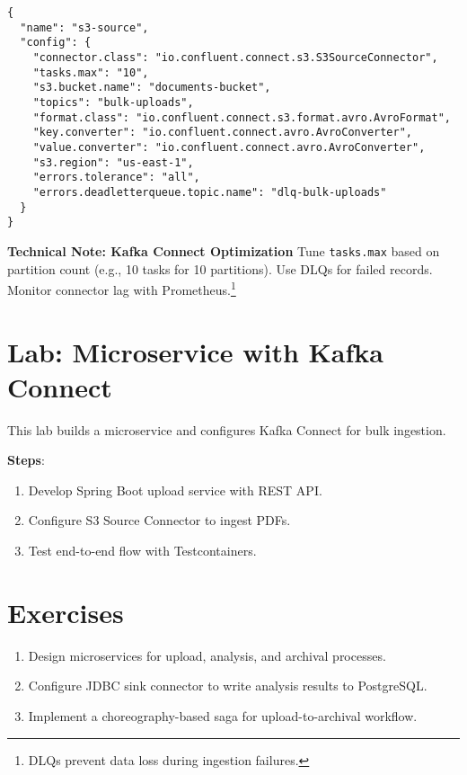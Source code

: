 \documentclass[11pt]{article}
\begin{document}
\begin{verbatim}
{
  "name": "s3-source",
  "config": {
    "connector.class": "io.confluent.connect.s3.S3SourceConnector",
    "tasks.max": "10",
    "s3.bucket.name": "documents-bucket",
    "topics": "bulk-uploads",
    "format.class": "io.confluent.connect.s3.format.avro.AvroFormat",
    "key.converter": "io.confluent.connect.avro.AvroConverter",
    "value.converter": "io.confluent.connect.avro.AvroConverter",
    "s3.region": "us-east-1",
    "errors.tolerance": "all",
    "errors.deadletterqueue.topic.name": "dlq-bulk-uploads"
  }
}
\end{verbatim}

\begin{technote}
\textbf{Technical Note: Kafka Connect Optimization}\newline
Tune \texttt{tasks.max} based on partition count (e.g., 10 tasks for 10 partitions). Use DLQs for failed records. Monitor connector lag with Prometheus.\footnote{DLQs prevent data loss during ingestion failures.}
\end{technote}

\section{Lab: Microservice with Kafka Connect}
This lab builds a microservice and configures Kafka Connect for bulk ingestion.

\textbf{Steps}:
\begin{enumerate}
    \item Develop Spring Boot upload service with REST API.
    \item Configure S3 Source Connector to ingest PDFs.
    \item Test end-to-end flow with Testcontainers.
\end{enumerate}

\section{Exercises}
\begin{enumerate}
    \item Design microservices for upload, analysis, and archival processes.
    \item Configure JDBC sink connector to write analysis results to PostgreSQL.
    \item Implement a choreography-based saga for upload-to-archival workflow.
\end{enumerate}
\end{document}
